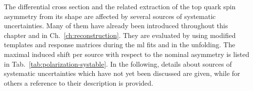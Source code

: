 The differential cross section and the related extraction of the top quark spin asymmetry from its shape are affected by several sources of systematic uncertainties. Many of them have already been introduced throughout this chapter and in Ch.~\ref{ch:reconstruction}. They are evaluated by using modified templates and response matrices during the \gls{ml} fits and in the unfolding. The maximal induced shift per source with respect to the nominal asymmetry is listed in Tab.~\ref{tab:polarization-systable}. In the following, details about sources of systematic uncertainties which have not yet been discussed are given, while for others a reference to their description is provided.

